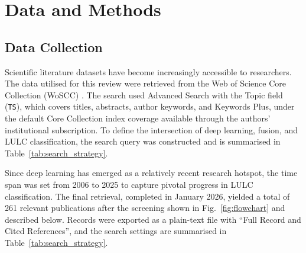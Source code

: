 \documentclass[]{interact}
\theoremstyle{plain}%
\theoremstyle{definition}
\theoremstyle{remark}
\begin{document}
\section{Data and Methods}

\subsection{Data Collection}
\label{sec:data_collection} 
Scientific literature datasets have become increasingly accessible to researchers. The data utilised for this review were retrieved from the Web of Science Core Collection (WoSCC) \citep{11}. The search used Advanced Search with the Topic field (\texttt{TS}), which covers titles, abstracts, author keywords, and Keywords Plus, under the default Core Collection index coverage available through the authors' institutional subscription. To define the intersection of deep learning, fusion, and LULC classification, the search query was constructed and is summarised in Table~\ref{tab:search_strategy}.

Since deep learning has emerged as a relatively recent research hotspot, the time span was set from 2006 to 2025 to capture pivotal progress in LULC classification. The final retrieval, completed in January 2026, yielded a total of 261 relevant publications after the screening shown in Fig.~\ref{fig:flowchart} and described below. Records were exported as a plain-text file with ``Full Record and Cited References'', and the search settings are summarised in Table~\ref{tab:search_strategy}.
\end{document}
